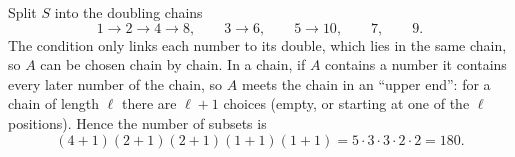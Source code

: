 Split $S$ into the doubling chains
\[
1\to2\to4\to8,\qquad 3\to6,\qquad 5\to10,\qquad 7,\qquad 9 .
\]
The condition only links each number to its double, which lies in the same chain, so $A$ can be chosen chain by chain. In a chain, if $A$ contains a number it contains every later number of the chain, so $A$ meets the chain in an ``upper end'': for a chain of length $\ell$ there are $\ell+1$ choices (empty, or starting at one of the $\ell$ positions). Hence the number of subsets is
\[
(4+1)(2+1)(2+1)(1+1)(1+1)=5\cdot3\cdot3\cdot2\cdot2=\boxed{180}.
\]
